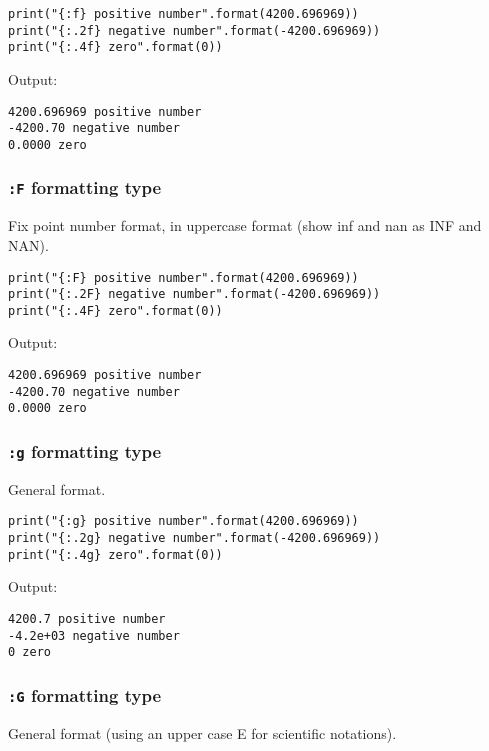 \documentclass[11pt]{article}
\begin{document}
\begin{verbatim}
print("{:f} positive number".format(4200.696969))
print("{:.2f} negative number".format(-4200.696969))
print("{:.4f} zero".format(0))
\end{verbatim}

 \noindent Output:

\label{orgd02d784}
\begin{verbatim}
4200.696969 positive number
-4200.70 negative number
0.0000 zero
\end{verbatim}
\subsubsection{\texttt{:F} formatting type}
\label{sec:org3e86caf}
Fix point number format, in uppercase format (show inf and nan as INF and NAN).

\begin{verbatim}
print("{:F} positive number".format(4200.696969))
print("{:.2F} negative number".format(-4200.696969))
print("{:.4F} zero".format(0))
\end{verbatim}

 \noindent Output:

\label{orgaaf0fe2}
\begin{verbatim}
4200.696969 positive number
-4200.70 negative number
0.0000 zero
\end{verbatim}
\subsubsection{\texttt{:g} formatting type}
\label{sec:org95d62e4}
General format.

\begin{verbatim}
print("{:g} positive number".format(4200.696969))
print("{:.2g} negative number".format(-4200.696969))
print("{:.4g} zero".format(0))
\end{verbatim}

 \noindent Output:

\label{org892a9ba}
\begin{verbatim}
4200.7 positive number
-4.2e+03 negative number
0 zero
\end{verbatim}
\subsubsection{\texttt{:G} formatting type}
\label{sec:orgfda8d7a}
General format (using an upper case E for scientific notations).
\end{document}
